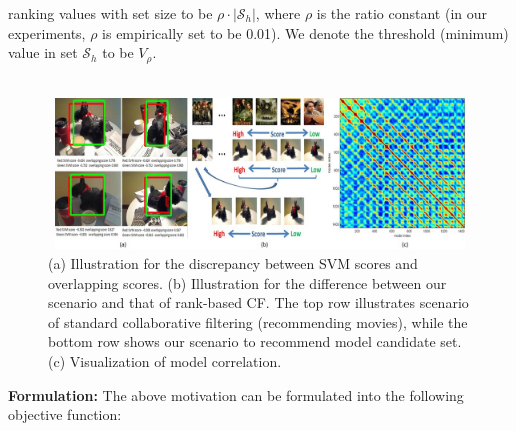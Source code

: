 \documentclass{article} %
\begin{document}
ranking values with set size to be $\rho\cdot|\mathcal{S}_h|$, where $\rho$ is the ratio constant (in our experiments, $\rho$ is empirically set to be 0.01). We denote the threshold (minimum) value in set $\mathcal{S}_h$ to be $V_\rho$. \\\\

\begin{figure}
\begin{center}
\includegraphics[width=14cm,height=4cm]{fig/figure1total.jpg}
\end{center}
\caption{(a) Illustration for the discrepancy between SVM scores and overlapping scores. (b) Illustration for the difference between our scenario and that of rank-based CF. The top row illustrates scenario of standard collaborative filtering (recommending movies), while the bottom row shows our scenario to recommend model candidate set. (c) Visualization of model correlation.}
\label{HIRLMFprobeselection}
\end{figure}

\textbf{Formulation:} The above motivation can be formulated into the following objective function:
\end{document}
